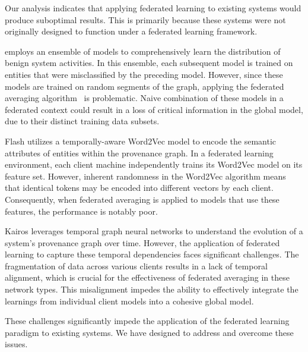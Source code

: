 Our analysis indicates that applying federated learning to existing systems would produce suboptimal results. This is primarily because these systems were not originally designed to function under a federated learning framework.

\threatrace employs an ensemble of \gnnshort models to comprehensively learn the distribution of benign system activities. In this ensemble, each subsequent model is trained on entities that were misclassified by the preceding model. However, since these models are trained on random segments of the graph, applying the federated averaging algorithm~\cite{mcmahan2017communication} is problematic. Naive combination of these models in a federated context could result in a loss of critical information in the global model, due to their distinct training data subsets.

Flash utilizes a temporally-aware Word2Vec model to encode the semantic attributes of entities within the provenance graph. In a federated learning environment, each client machine independently trains its Word2Vec model on its feature set. However, inherent randomness in the Word2Vec algorithm means that identical tokens may be encoded into different vectors by each client. Consequently, when federated averaging is applied to \gnn models that use these features, the performance is notably poor.

Kairos leverages temporal graph neural networks to understand the evolution of a system's provenance graph over time. However, the application of federated learning to capture these temporal dependencies faces significant challenges. The fragmentation of data across various clients results in a lack of temporal alignment, which is crucial for the effectiveness of federated averaging in these network types. This misalignment impedes the ability to effectively integrate the learnings from individual client models into a cohesive global model.

These challenges significantly impede the application of the federated learning paradigm to existing systems. We have designed \Sys to address and overcome these issues.

